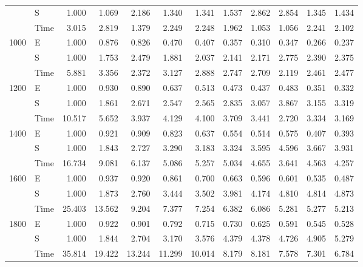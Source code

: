 \begin{table}[H]
\begin{tabular}{|l|l|rrrrrrrrrr|}
        & S    & 1.000  & 1.069  & 2.186  & 1.340  & 1.341  & 1.537  & 2.862  & 2.854 & 1.345 & 1.434 \\
        & Time & 3.015  & 2.819  & 1.379  & 2.249  & 2.248  & 1.962  & 1.053  & 1.056 & 2.241 & 2.102 \\
        \cline{1-12}
        \multirow[t]{3}{*}{1000} & E    & 1.000  & 0.876  & 0.826  & 0.470  & 0.407  & 0.357  & 0.310  & 0.347 & 0.266 & 0.237 \\
        & S    & 1.000  & 1.753  & 2.479  & 1.881  & 2.037  & 2.141  & 2.171  & 2.775 & 2.390 & 2.375 \\
        & Time & 5.881  & 3.356  & 2.372  & 3.127  & 2.888  & 2.747  & 2.709  & 2.119 & 2.461 & 2.477 \\
        \cline{1-12}
        \multirow[t]{3}{*}{1200} & E    & 1.000  & 0.930  & 0.890  & 0.637  & 0.513  & 0.473  & 0.437  & 0.483 & 0.351 & 0.332 \\
        & S    & 1.000  & 1.861  & 2.671  & 2.547  & 2.565  & 2.835  & 3.057  & 3.867 & 3.155 & 3.319 \\
        & Time & 10.517 & 5.652  & 3.937  & 4.129  & 4.100  & 3.709  & 3.441  & 2.720 & 3.334 & 3.169 \\
        \cline{1-12}
        \multirow[t]{3}{*}{1400} & E    & 1.000  & 0.921  & 0.909  & 0.823  & 0.637  & 0.554  & 0.514  & 0.575 & 0.407 & 0.393 \\
        & S    & 1.000  & 1.843  & 2.727  & 3.290  & 3.183  & 3.324  & 3.595  & 4.596 & 3.667 & 3.931 \\
        & Time & 16.734 & 9.081  & 6.137  & 5.086  & 5.257  & 5.034  & 4.655  & 3.641 & 4.563 & 4.257 \\
        \cline{1-12}
        \multirow[t]{3}{*}{1600} & E    & 1.000  & 0.937  & 0.920  & 0.861  & 0.700  & 0.663  & 0.596  & 0.601 & 0.535 & 0.487 \\
        & S    & 1.000  & 1.873  & 2.760  & 3.444  & 3.502  & 3.981  & 4.174  & 4.810 & 4.814 & 4.873 \\
        & Time & 25.403 & 13.562 & 9.204  & 7.377  & 7.254  & 6.382  & 6.086  & 5.281 & 5.277 & 5.213 \\
        \cline{1-12}
        \multirow[t]{3}{*}{1800} & E    & 1.000  & 0.922  & 0.901  & 0.792  & 0.715  & 0.730  & 0.625  & 0.591 & 0.545 & 0.528 \\
        & S    & 1.000  & 1.844  & 2.704  & 3.170  & 3.576  & 4.379  & 4.378  & 4.726 & 4.905 & 5.279 \\
        & Time & 35.814 & 19.422 & 13.244 & 11.299 & 10.014 & 8.179  & 8.181  & 7.578 & 7.301 & 6.784 \\

\end{tabular}
\end{table}
